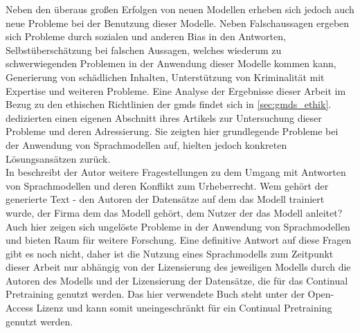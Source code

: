 Neben den überaus großen Erfolgen von neuen Modellen erheben sich jedoch auch neue Probleme bei der Benutzung dieser Modelle.
Neben Falschaussagen ergeben sich Probleme durch sozialen und anderen Bias in den Antworten, Selbstüberschätzung bei falschen Aussagen, welches wiederum zu schwerwiegenden Problemen in der Anwendung dieser Modelle kommen kann, Generierung von schädlichen Inhalten, Unterstützung von Kriminalität mit Expertise und weiteren Probleme. Eine Analyse der Ergebnisse dieser Arbeit im Bezug zu den ethischen Richtlinien der \ac{gmds} findet sich in \ref{sec:gmds_ethik}.
\citet{gpt4} dedizierten einen eigenen Abschnitt ihres Artikels zur Untersuchung dieser Probleme und deren Adressierung.
Sie zeigten hier grundlegende Probleme bei der Anwendung von Sprachmodellen auf, hielten jedoch konkreten Lösungsansätzen zurück.\\

In \citet{plagiarism} beschreibt der Autor weitere Fragestellungen zu dem Umgang mit Antworten von Sprachmodellen und deren Konflikt zum Urheberrecht.
Wem gehört der generierte Text - den Autoren der Datensätze auf dem das Modell trainiert wurde, der Firma dem das Modell gehört, dem Nutzer der das Modell anleitet? 
Auch hier zeigen sich ungelöste Probleme in der Anwendung von Sprachmodellen und bieten Raum für weitere Forschung. Eine definitive Antwort auf diese Fragen gibt es noch nicht, daher ist die Nutzung eines Sprachmodells zum Zeitpunkt dieser Arbeit nur abhängig von der Lizensierung des jeweiligen Modells durch die Autoren des Modells und der Lizensierung der Datensätze, die für das Continual Pretraining genutzt werden. Das hier verwendete Buch \citet{bb} steht unter der Open-Access Lizenz und kann somit uneingeschränkt für ein Continual Pretraining genutzt werden.\\
